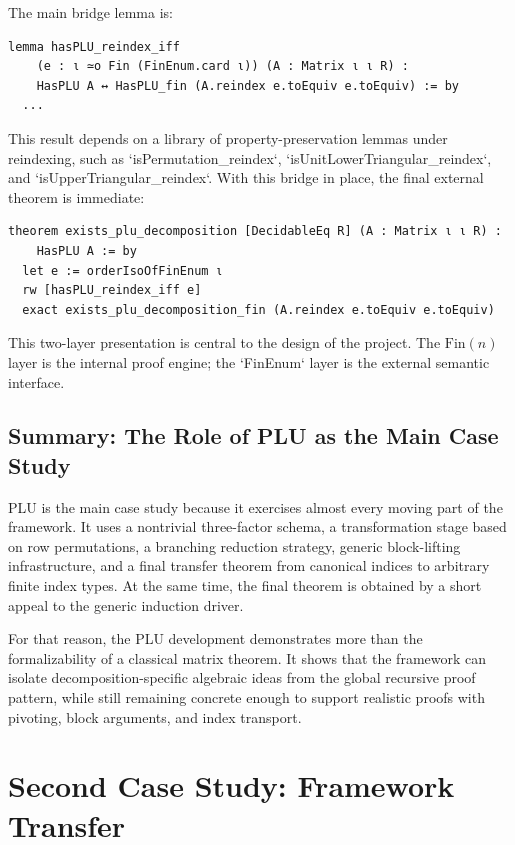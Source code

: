 \documentclass[pdflatex,sn-mathphys-num]{sn-jnl}%
\theoremstyle{thmstyleone}%
\theoremstyle{thmstyletwo}%
\theoremstyle{thmstylethree}%
\begin{document}
The main bridge lemma is:

\begin{lstlisting}
lemma hasPLU_reindex_iff
    (e : ι ≃o Fin (FinEnum.card ι)) (A : Matrix ι ι R) :
    HasPLU A ↔ HasPLU_fin (A.reindex e.toEquiv e.toEquiv) := by
  ...
\end{lstlisting}

This result depends on a library of property-preservation lemmas under reindexing, such as `isPermutation_reindex`, `isUnitLowerTriangular_reindex`, and `isUpperTriangular_reindex`.  With this bridge in place, the final external theorem is immediate:

\begin{lstlisting}
theorem exists_plu_decomposition [DecidableEq R] (A : Matrix ι ι R) :
    HasPLU A := by
  let e := orderIsoOfFinEnum ι
  rw [hasPLU_reindex_iff e]
  exact exists_plu_decomposition_fin (A.reindex e.toEquiv e.toEquiv)
\end{lstlisting}

This two-layer presentation is central to the design of the project.  The \(\mathrm{Fin}(n)\) layer is the internal proof engine; the `FinEnum` layer is the external semantic interface.

\subsection{Summary: The Role of PLU as the Main Case Study}
PLU is the main case study because it exercises almost every moving part of the framework.  It uses a nontrivial three-factor schema, a transformation stage based on row permutations, a branching reduction strategy, generic block-lifting infrastructure, and a final transfer theorem from canonical indices to arbitrary finite index types.  At the same time, the final theorem is obtained by a short appeal to the generic induction driver.

For that reason, the PLU development demonstrates more than the formalizability of a classical matrix theorem.  It shows that the framework can isolate decomposition-specific algebraic ideas from the global recursive proof pattern, while still remaining concrete enough to support realistic proofs with pivoting, block arguments, and index transport.

\section{Second Case Study: Framework Transfer}%
\label{sec:second-case}
\end{document}

